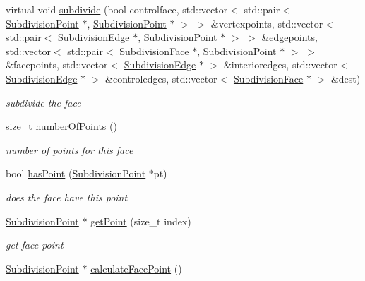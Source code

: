 \begin{DoxyCompactItemize}
virtual void \hyperlink{classShipCAD_1_1SubdivisionFace_a934edbf44e524a2ec250f896c3cc182d}{subdivide} (bool controlface, std\-::vector$<$ std\-::pair$<$ \hyperlink{classShipCAD_1_1SubdivisionPoint}{Subdivision\-Point} $\ast$, \hyperlink{classShipCAD_1_1SubdivisionPoint}{Subdivision\-Point} $\ast$ $>$ $>$ \&vertexpoints, std\-::vector$<$ std\-::pair$<$ \hyperlink{classShipCAD_1_1SubdivisionEdge}{Subdivision\-Edge} $\ast$, \hyperlink{classShipCAD_1_1SubdivisionPoint}{Subdivision\-Point} $\ast$ $>$ $>$ \&edgepoints, std\-::vector$<$ std\-::pair$<$ \hyperlink{classShipCAD_1_1SubdivisionFace}{Subdivision\-Face} $\ast$, \hyperlink{classShipCAD_1_1SubdivisionPoint}{Subdivision\-Point} $\ast$ $>$ $>$ \&facepoints, std\-::vector$<$ \hyperlink{classShipCAD_1_1SubdivisionEdge}{Subdivision\-Edge} $\ast$ $>$ \&interioredges, std\-::vector$<$ \hyperlink{classShipCAD_1_1SubdivisionEdge}{Subdivision\-Edge} $\ast$ $>$ \&controledges, std\-::vector$<$ \hyperlink{classShipCAD_1_1SubdivisionFace}{Subdivision\-Face} $\ast$ $>$ \&dest)
\begin{DoxyCompactList}\small\item\em subdivide the face \end{DoxyCompactList}\item 
size\-\_\-t \hyperlink{classShipCAD_1_1SubdivisionFace_ad56c693e21a77c3676430babcf49de7e}{number\-Of\-Points} ()
\begin{DoxyCompactList}\small\item\em number of points for this face \end{DoxyCompactList}\item 
bool \hyperlink{classShipCAD_1_1SubdivisionFace_a575f9199178fc28c9229fa4c7d2824ef}{has\-Point} (\hyperlink{classShipCAD_1_1SubdivisionPoint}{Subdivision\-Point} $\ast$pt)
\begin{DoxyCompactList}\small\item\em does the face have this point \end{DoxyCompactList}\item 
\hyperlink{classShipCAD_1_1SubdivisionPoint}{Subdivision\-Point} $\ast$ \hyperlink{classShipCAD_1_1SubdivisionFace_a0df579a3063c124ca2355eba4ece7480}{get\-Point} (size\-\_\-t index)
\begin{DoxyCompactList}\small\item\em get face point \end{DoxyCompactList}\item 
\hyperlink{classShipCAD_1_1SubdivisionPoint}{Subdivision\-Point} $\ast$ \hyperlink{classShipCAD_1_1SubdivisionFace_aeb9c6f01f3896dc39819265922a04892}{calculate\-Face\-Point} ()

\end{DoxyCompactItemize}
